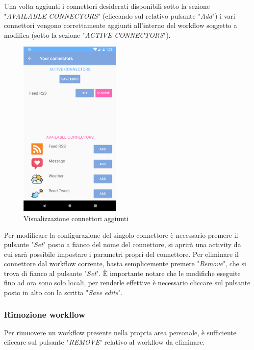 Una volta aggiunti i connettori desiderati disponibili sotto la sezione "\textit{AVAILABLE CONNECTORS}" (cliccando sul relativo pulsante "\textit{Add}") i vari connettori vengono correttamente aggiunti all'interno del workflow soggetto a modifica (sotto la sezione "\textit{ACTIVE CONNECTORS}").
\begin{figure}[H]
	\centering
	\includegraphics[width=5cm]{../includes/pics/example_connector_added_to_workflow.png}
	\caption{\label{fig:example_connector_added_to_workflow}Visualizzazione connettori aggiunti}
\end{figure}
Per modificare la configurazione del singolo connettore è necessario premere il pulsante "\textit{Set}" posto a fianco del nome del connettore, si aprirà una activity da cui sarà possibile impostare i parametri propri del connettore.
Per eliminare il connettore dal workflow corrente, basta semplicemente premere "\textit{Remove}", che si trova di fianco al pulsante "\textit{Set}".
\`E importante notare che le modifiche eseguite fino ad ora sono solo locali, per renderle effettive è necessario cliccare sul pulsante posto in alto con la scritta "\textit{Save edits}".

\subsubsection{Rimozione workflow}
\label{sec:sec_rimozione_workflow}
Per rimuovere un workflow presente nella propria area personale, è sufficiente cliccare sul pulsante "\textit{REMOVE}" relativo al workflow da eliminare.